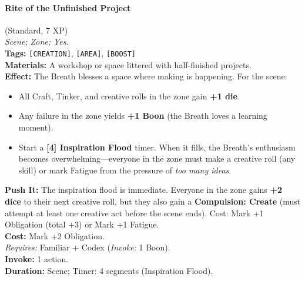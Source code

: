 \paragraph{Rite of the Unfinished Project} (Standard, 7 XP) \hfill \\
\emph{Scene; Zone; Yes.} \\
\textbf{Tags:} \texttt{[CREATION]}, \texttt{[AREA]}, \texttt{[BOOST]} \\
\textbf{Materials:} A workshop or space littered with half-finished projects. \\
\textbf{Effect:} The Breath blesses a space where making is happening. For the scene:
\begin{itemize}
  \item All Craft, Tinker, and creative rolls in the zone gain \textbf{+1 die}.
  \item Any failure in the zone yields \textbf{+1 Boon} (the Breath loves a learning moment).
  \item Start a \textbf{[4] Inspiration Flood} timer. When it fills, the Breath's enthusiasm becomes overwhelming---everyone in the zone must make a creative roll (any skill) or mark Fatigue from the pressure of \emph{too many ideas}.
\end{itemize}
\textbf{Push It:} The inspiration flood is immediate. Everyone in the zone gains \textbf{+2 dice} to their next creative roll, but they also gain a \textbf{Compulsion: Create} (must attempt at least one creative act before the scene ends). Cost: Mark +1 Obligation (total +3) or Mark +1 Fatigue. \\
\textbf{Cost:} Mark +2 Obligation. \\
\textit{Requires:} Familiar + Codex (\textit{Invoke:} 1 Boon). \\
\textbf{Invoke:} 1 action. \\
\textbf{Duration:} Scene; Timer: 4 segments (Inspiration Flood).

